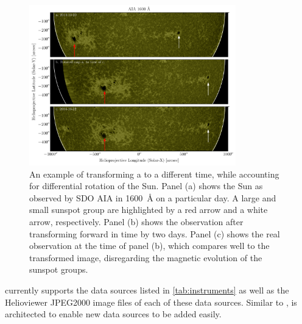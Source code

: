 \begin{figure}
    \center
    \includegraphics[width = 0.8\textwidth]{figures/fig_diff_rot_1600.pdf}
    \caption{An example of transforming a \Map to a different time, while accounting for differential rotation of the Sun.
    Panel (a) shows the Sun as observed by SDO AIA in 1600~\AA{} on a particular day.
    A large and small sunspot group are highlighted by a red arrow and a white arrow, respectively.
    Panel (b) shows the observation after transforming forward in time by two days.
    Panel (c) shows the real observation at the time of panel (b), which compares well to the transformed image, disregarding the magnetic evolution of the sunspot groups.}
    \label{fig:diff_rot}
\end{figure}

\Map currently supports the data sources listed in \autoref{tab:instruments} as well as the Helioviewer JPEG2000 image files of  each of these data sources.
Similar to \Timeseries, \Map is architected to enable new data sources to be added easily.
